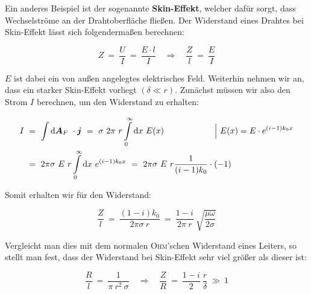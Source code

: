 Ein anderes Beispiel ist der sogenannte \textbf{Skin-Effekt}, welcher dafür sorgt, dass Wechselströme an der Drahtoberfläche fließen. Der Widerstand eines Drahtes bei Skin-Effekt lässt sich folgendermaßen berechnen:

\begin{equation*}
Z \ = \ \frac{U}{I} \ = \ \frac{E \cdot l}{I} \quad \Rightarrow \quad \frac{Z}{l} \ = \ \frac{E}{I}
\end{equation*}

$E$ ist dabei ein von außen angelegtes elektrisches Feld. Weiterhin nehmen wir an, dass ein starker Skin-Effekt vorliegt $(\delta\ll r)$. Zunächst müssen wir also den Strom $I$ berechnen, um den Widerstand zu erhalten:


\begin{align*}
I  \ &= \ \Int{}{}{\vec{A}_F}\cdot\vec{j} \ = \ \sigma \ 2 \pi \ r \Int{0}{\infty}{x} E(x) \qquad\qquad\qquad\Big| \ E(x) = E\cdot e^{(i-1)k_0 x}\\
&= \ 2\pi \sigma \ E \ r \Int{0}{\infty}{x}e^{(i-1)k_0 x}  \ = \ 2\pi\sigma \ E \ r  \frac{1}{(i-1)k_0}\cdot(-1) 
\end{align*}

\newpage
Somit erhalten wir für den Widerstand:

\begin{equation*}
\frac{Z}{l}  \ = \ \frac{(1-i)k_0}{2\pi\sigma \ r} \ = \ \frac{1-i}{2\pi \ r}\ \sqrt{\frac{\mu\omega}{2\sigma}}
\end{equation*}

Vergleicht man dies mit dem normalen \textsc{Ohm}'schen Widerstand eines Leiters, so stellt man fest, dass der Widerstand bei Skin-Effekt sehr viel größer als dieser ist:

\begin{equation*}
\frac{R}{l} \ = \ \frac{1}{\pi \ r^2 \ \sigma} \quad \Rightarrow \quad \frac{Z}{R}  \ = \ \frac{1-i}{2} \ \frac{r}{\delta} \ \gg \ 1
\end{equation*}
